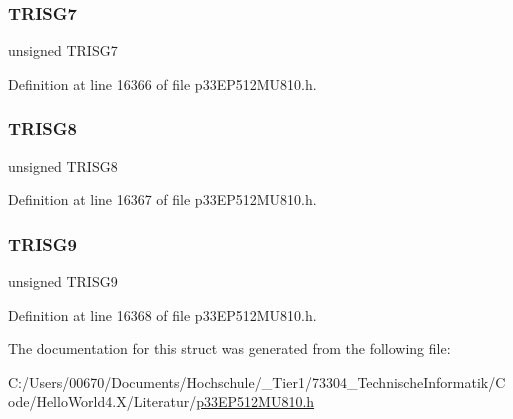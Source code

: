 \subsubsection{\texorpdfstring{T\+R\+I\+S\+G7}{TRISG7}}
{\footnotesize\ttfamily unsigned T\+R\+I\+S\+G7}



Definition at line 16366 of file p33\+E\+P512\+M\+U810.\+h.

\mbox{\label{structtag_t_r_i_s_g_b_i_t_s_a28536e7ea40455683e0444841d272110}} 
\subsubsection{\texorpdfstring{T\+R\+I\+S\+G8}{TRISG8}}
{\footnotesize\ttfamily unsigned T\+R\+I\+S\+G8}



Definition at line 16367 of file p33\+E\+P512\+M\+U810.\+h.

\mbox{\label{structtag_t_r_i_s_g_b_i_t_s_a03565ad5659d5d41aaf64ff16a7134bd}} 
\subsubsection{\texorpdfstring{T\+R\+I\+S\+G9}{TRISG9}}
{\footnotesize\ttfamily unsigned T\+R\+I\+S\+G9}



Definition at line 16368 of file p33\+E\+P512\+M\+U810.\+h.



The documentation for this struct was generated from the following file\+:\begin{DoxyCompactItemize}
\item 
C\+:/\+Users/00670/\+Documents/\+Hochschule/\+\_\+\+Tier1/73304\+\_\+\+Technische\+Informatik/\+Code/\+Hello\+World4.\+X/\+Literatur/\hyperlink{p33_e_p512_m_u810_8h}{p33\+E\+P512\+M\+U810.\+h}\end{DoxyCompactItemize}
